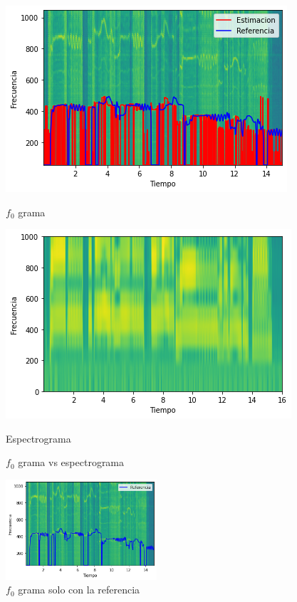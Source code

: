 \documentclass[a4paper]{article}
\begin{document}
\begin{figure}[!h]
\begin{minipage}[b]{0.5\linewidth}
\centering
\includegraphics[width=\linewidth]{f0grama.png}
\caption{$f_0$ grama}
\label{f0grama}
\end{minipage}
\hspace{0.5cm}
\begin{minipage}[b]{0.5\linewidth}
\centering
\includegraphics[width=\linewidth]{espectrograma.png}
\caption{Espectrograma}
\label{espect}
\end{minipage}
\caption{$f_0$ grama vs espectrograma}
\label{comparacion}
\end{figure}

\begin{figure}[h!]
\centering
\includegraphics[width=0.5\textwidth]{soloref.png}
\caption{$f_0$ grama solo con la referencia}
\label{soloref}
\end{figure}
\end{document}
